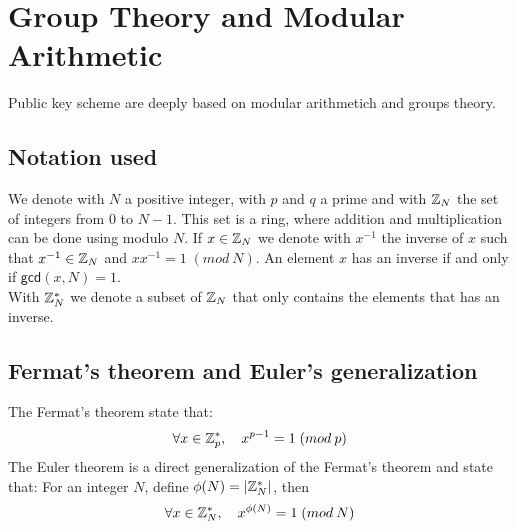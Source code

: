\section{Group Theory and Modular Arithmetic}
Public key scheme are deeply based on modular arithmetich and groups theory.
\subsection{Notation used}
We denote with $N$ a positive integer, with $p$ and $q$ a prime and with $\mathbb{Z}_N$ the set of integers from $0$ to $N-1$. This set is a ring, where addition and multiplication can be done using modulo $N$. If $x \in \mathbb{Z}_N$ we denote with $x^{-1}$ the inverse of $x$ such that $x^{-1} \in \mathbb{Z}_N$ and $xx^{-1} = 1 \; (mod \: N)$. An element $x$ has an inverse if and only if $\mathsf{gcd}(x,N) = 1$.\\
With $\mathbb{Z}_N^{*}$ we denote a subset of $\mathbb{Z}_N$ that only contains the elements that has an inverse.
\subsection{Fermat's theorem and Euler's generalization}
The Fermat's theorem state that:
$$
    \forall x \in \mathbb{Z}_p^{*}, \quad x^{p-1} = 1 \; (mod \: p)
$$
The Euler theorem is a direct generalization of the Fermat's theorem and state that:
For an integer $N$, define $\phi(N) = |\mathbb{Z}_N^{*}|$, then
$$
    \forall x \in \mathbb{Z}_N^{*}, \quad x^{\phi(N)} = 1 \; (mod \: N)
$$
